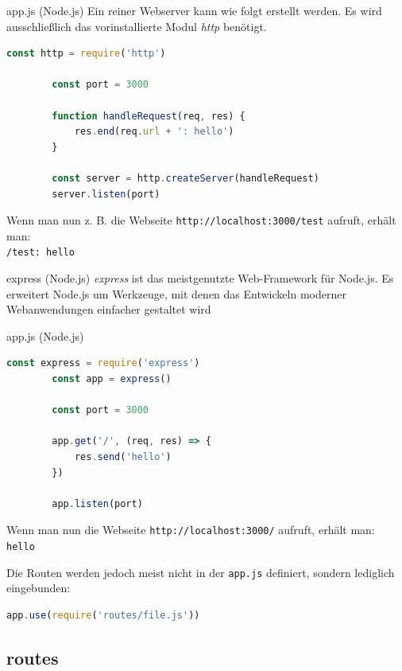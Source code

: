 \begin{example}{app.js (Node.js)}
    Ein reiner Webserver kann wie folgt erstellt werden.
    Es wird ausschließlich das vorinstallierte Modul \emph{http} benötigt.

    \begin{lstlisting}[language=JavaScript]
        const http = require('http')

        const port = 3000

        function handleRequest(req, res) {
            res.end(req.url + ': hello')
        }

        const server = http.createServer(handleRequest)
        server.listen(port)
    \end{lstlisting}

    Wenn man nun z. B. die Webseite \texttt{http://localhost:3000/test} aufruft, erhält man:\\
    \texttt{/test: hello}
\end{example}

\begin{defi}{express (Node.js)}
    \emph{express} ist das meistgenutzte Web-Framework für Node.js.
    Es erweitert Node.js um Werkzeuge, mit denen das Entwickeln moderner Webanwendungen einfacher gestaltet wird
\end{defi}

\begin{example}{app.js (Node.js)}
    \begin{lstlisting}[language=JavaScript]
        const express = require('express')
        const app = express()

        const port = 3000

        app.get('/', (req, res) => {
            res.send('hello')
        })

        app.listen(port)
    \end{lstlisting}

    Wenn man nun die Webseite \texttt{http://localhost:3000/} aufruft, erhält man:\\
    \texttt{hello}

    Die Routen werden jedoch meist nicht in der \texttt{app.js} definiert, sondern lediglich eingebunden:
    \begin{lstlisting}[language=JavaScript]
        app.use(require('routes/file.js'))
    \end{lstlisting}
\end{example}

\subsection{routes}

